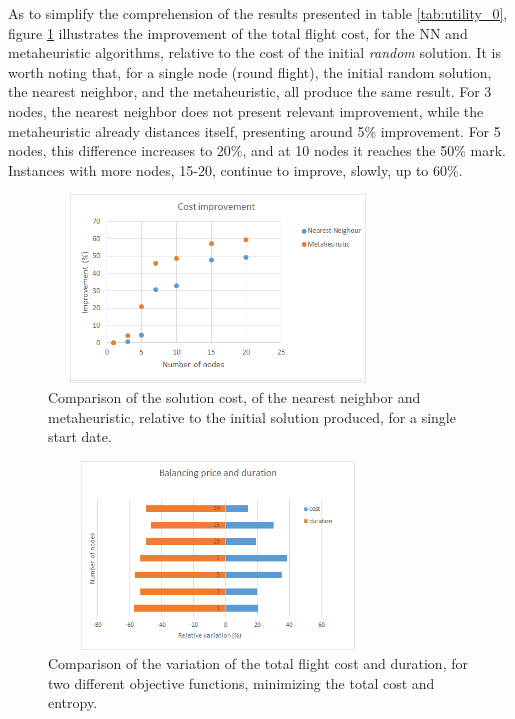 As to simplify the comprehension of the results presented in table \ref{tab:utility_0}, figure \ref{fig:prices_0} illustrates the improvement of the total flight cost, for the NN and metaheuristic algorithms, relative to the cost of the initial \textit{random} solution. It is worth noting that, for a single node (round flight), the initial random solution, the nearest neighbor, and the metaheuristic, all produce the same result. For 3 nodes, the nearest neighbor does not present relevant improvement, while the metaheuristic already distances itself, presenting around 5\% improvement. For 5 nodes, this difference increases to 20\%, and at 10 nodes it reaches the 50\% mark. Instances with more nodes, 15-20, continue to improve, slowly, up to 60\%.

\begin{figure}[tbp]
  \centering
  \includegraphics[width=9cm, height=5cm]{./imgs/improvement_0.png}
  \caption{Comparison of the solution cost, of the nearest neighbor and metaheuristic, relative to the initial solution produced, for a single start date.}
  \label{fig:prices_0}  
\end{figure}


\begin{figure}[tbp]
  \centering
  \includegraphics[width=9cm, height=5cm]{./imgs/cost_vs_time.png}
  \caption{Comparison of the variation of the total flight cost and duration, for two different objective functions, minimizing the total cost and entropy.}
  \label{fig:cost_vs_time}  
\end{figure}


